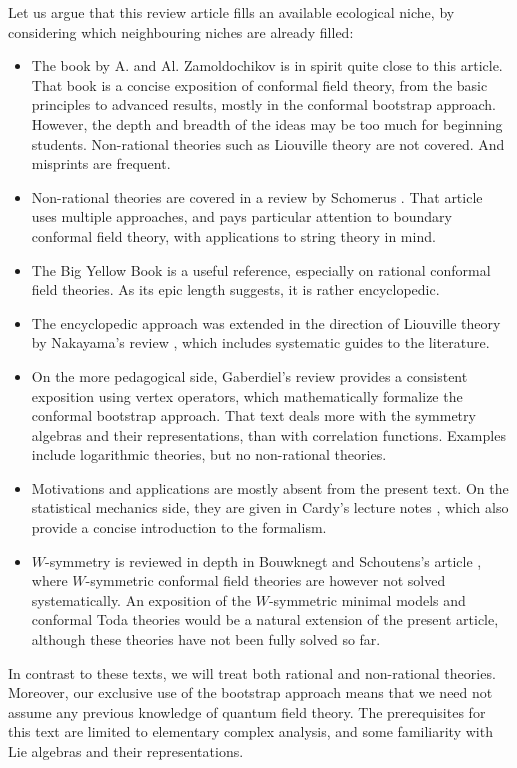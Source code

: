 \documentclass[12pt, a4paper, notitlepage, twoside]{report}
\numberwithin{equation}{section}
\theoremstyle{break}
\begin{document}
Let us argue that this review article fills an available ecological niche, by considering which neighbouring niches are already filled: 
\begin{itemize}
\item 
The book \cite{zz90} by A. and Al. Zamoldochikov is in spirit quite close to this article.
That book is a concise exposition of conformal field theory, from the basic principles to advanced results, mostly in the conformal bootstrap approach.
However, the depth and breadth of the ideas may be too much for beginning students.
Non-rational theories such as Liouville theory are not covered.
And misprints are frequent.
\item
Non-rational theories are covered in a review by Schomerus \cite{sch05}.
That article uses multiple approaches, and pays particular attention to boundary conformal field theory, with applications to string theory in mind. 
\item
The Big Yellow Book \cite{fms97} is a useful reference, especially on rational conformal field theories.
As its epic length suggests, it is rather encyclopedic. 
\item
The encyclopedic approach was extended in the direction of Liouville theory by Nakayama's review \cite{nak04}, which includes systematic guides to the literature.
\item 
On the more pedagogical side, Gaberdiel's review \cite{gab99} provides a consistent exposition using vertex operators, which mathematically formalize the conformal bootstrap approach.
That text deals more with the symmetry algebras and their representations, than with correlation functions.
Examples include logarithmic theories, but no non-rational theories.
\item
Motivations and applications are mostly absent from the present text.
On the statistical mechanics side, they are given in Cardy's lecture notes \cite{car08}, which also provide a concise introduction to the formalism.
\item 
$W$-symmetry is reviewed in depth in Bouwknegt and Schoutens's article \cite{bs92}, where $W$-symmetric conformal field theories are however not solved systematically.
An exposition of the $W$-symmetric minimal models and conformal Toda theories would be a natural extension of the present article, although these theories have not been fully solved so far. 
\end{itemize}
In contrast to these texts, we will treat both rational and non-rational theories.
Moreover, our exclusive use of the bootstrap approach means that we need not assume any previous knowledge of quantum field theory.
The prerequisites for this text are limited to 
elementary complex analysis, and some familiarity with Lie algebras and their representations.
\end{document}
